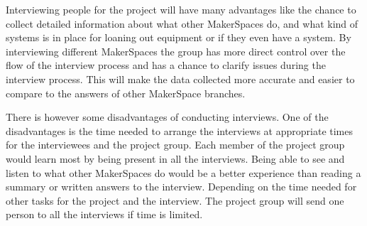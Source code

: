 Interviewing people for the project will have many advantages like the chance to collect detailed information about what other MakerSpaces do, and what kind of systems is in place for loaning out equipment or if they even have a system. By interviewing different MakerSpaces the group has more direct control over the flow of the interview process and has a chance to clarify issues during the interview process. This will make the data collected more accurate and easier to compare to the answers of other MakerSpace branches.

There is however some disadvantages of conducting interviews. One of the disadvantages is the time needed to arrange the interviews at appropriate times for the interviewees and the project group. Each member of the project group would learn most by being present in all the interviews. Being able to see and listen to what other MakerSpaces do would be a better experience than reading a summary or written answers to the interview. Depending on the time needed for other tasks for the project and the interview. The project group will send one person to all the interviews if time is limited.    


